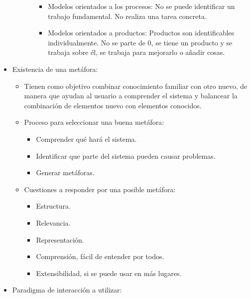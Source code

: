 \documentclass[12pt, twoside, openright]{report} %
\begin{document}
\begin{itemize}
\begin{itemize}
\begin{itemize}
          \begin{itemize}
          
          \item
            Modelos orientados a los procesos: No se puede identificar
            un trabajo fundamental. No realiza una tarea concreta.
          \item
            Modelos orientados a productos: Productos son identificables
            individualmente. No se parte de 0, se tiene un producto y se
            trabaja sobre él, se trabaja para mejorarlo o añadir cosas.
          \end{itemize}
        \end{itemize}
      \end{itemize}
    \item
      Existencia de una metáfora:

      \begin{itemize}
      
      \item
        Tienen como objetivo combinar conocimiento familiar con otro
        nuevo, de manera que ayudan al usuario a comprender el sistema y
        balancear la combinación de elementos nuevo con elementos
        conocidos.
      \item
        Proceso para seleccionar una buena metáfora:

        \begin{itemize}
        
        \item
          Comprender qué hará el sistema.
        \item
          Identificar que parte del sistema pueden causar problemas.
        \item
          Generar metáforas.
        \end{itemize}
        \pagebreak
      \item
        Cuestiones a responder por una posible metáfora:

        \begin{itemize}
        
        \item
          Estructura.
        \item
          Relevancia.
        \item
          Representación.
        \item
          Comprensión, fácil de entender por todos.
        \item
          Extensibilidad, si se puede usar en más lugares.
        \end{itemize}
      \end{itemize}
    \item
      Paradigma de interacción a utilizar:


\end{itemize}
\end{document}
